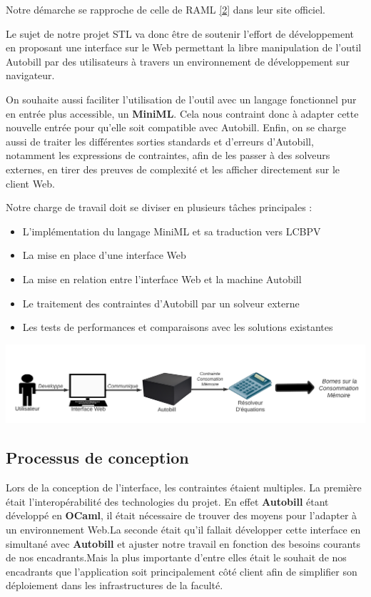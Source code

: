 \documentclass[
  12pt,
]{article}
\providecommand{\tightlist}{%
  \setlength{\itemsep}{0pt}\setlength{\parskip}{0pt}}
\begin{document}
Notre démarche se rapproche de celle de RAML
\protect\hyperlink{biblio}{{[}2{]}} dans leur site officiel.

Le sujet de notre projet STL va donc être de soutenir l'effort de
développement en proposant une interface sur le Web permettant la libre
manipulation de l'outil Autobill par des utilisateurs à travers un
environnement de développement sur navigateur.

On souhaite aussi faciliter l'utilisation de l'outil avec un langage
fonctionnel pur en entrée plus accessible, un \textbf{MiniML}. Cela nous
contraint donc à adapter cette nouvelle entrée pour qu'elle soit
compatible avec Autobill. Enfin, on se charge aussi de traiter les
différentes sorties standards et d'erreurs d'Autobill, notamment les
expressions de contraintes, afin de les passer à des solveurs externes,
en tirer des preuves de complexité et les afficher directement sur le
client Web.

Notre charge de travail doit se diviser en plusieurs tâches principales
:

\begin{itemize}
\tightlist
\item
  L'implémentation du langage MiniML et sa traduction vers LCBPV
\item
  La mise en place d'une interface Web
\item
  La mise en relation entre l'interface Web et la machine Autobill
\item
  Le traitement des contraintes d'Autobill par un solveur externe
\item
  Les tests de performances et comparaisons avec les solutions
  existantes
\end{itemize}

\includegraphics{./MarkdownVersions/Rapport/Diagramme Haut Niveau PSTL.png}

\hypertarget{processus-de-conception}{%
\subsection{Processus de conception}\label{processus-de-conception}}

Lors de la conception de l'interface, les contraintes étaient multiples.
La première était l'interopérabilité des technologies du projet. En
effet \textbf{Autobill} étant développé en \textbf{OCaml}, il était
nécessaire de trouver des moyens pour l'adapter à un environnement
Web.La seconde était qu'il fallait développer cette interface en
simultané avec \textbf{Autobill} et ajuster notre travail en fonction
des besoins courants de nos encadrants.Mais la plus importante d'entre
elles était le souhait de nos encadrants que l'application soit
principalement côté client afin de simplifier son déploiement dans les
infrastructures de la faculté.
\end{document}
